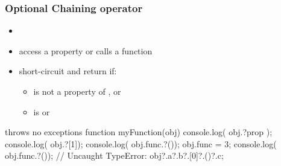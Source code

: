 \begin{frame}[fragile]
  \frametitle{Optional Chaining operator}
  \begin{itemize}
    \item {}
    \item access a property or calls a function
    \item short-circuit and return  if:
    \begin{itemize}
      \item {} is not a property of , or
      \item {} is  or 
    \end{itemize}
  \end{itemize}
\begin{CodeBox}{throws no exceptions}
  function myFunction(obj) {
    console.log( obj.?prop );
    console.log( obj.?[1]);
    console.log( obj.func.?());
    obj.func = 3;
    console.log( obj.func.?()); // Uncaught TypeError:
    obj?.a?.b?.[0]?.()?.c;
  }
\end{CodeBox}

\end{frame}


